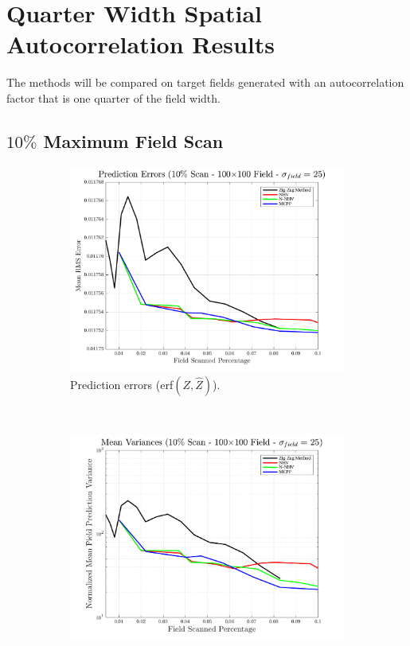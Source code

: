 \section{Quarter Width Spatial Autocorrelation Results}
The methods will be compared on target fields generated with an autocorrelation factor that is one quarter of the field width.

\clearpage
\subsection{$10\%$ Maximum Field Scan}
\begin{figure}[htb!]
    \centering
    \begin{subfigure}[t]{0.65\textwidth}
        \centering
        \includegraphics[width=\linewidth]{figures/hbresults/pred_errs_10p_100x100_sf_25_seed_2.png}
        \captionsetup{skip=0.20\baselineskip,size=footnotesize}
        \caption{Prediction errors (erf$(Z,\hat{Z})$).}
        \label{fig:prederrs_sigma25_p10_s2}
    \end{subfigure}%
    \\
    \begin{subfigure}[t]{0.65\textwidth}
        \centering
        \includegraphics[width=\linewidth]{figures/hbresults/vars_10p_100x100_sf_25_seed_2.png}

\end{subfigure}
\end{figure}
